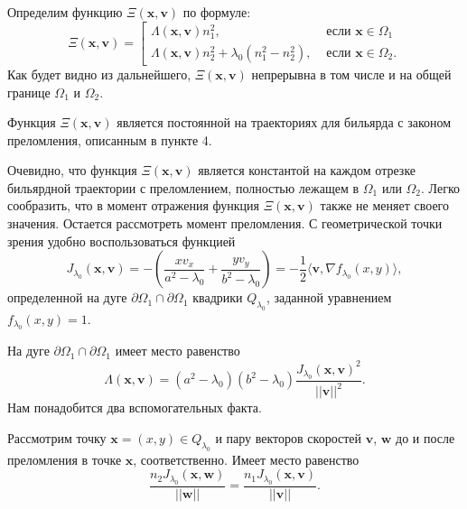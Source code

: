 Определим функцию $\Xi(\mathbf{x}, \mathbf{v})$ по формуле: 
\begin{equation*}
\Xi(\mathbf{x}, \mathbf{v}) = \left[
\begin{array}{ll}
    \Lambda(\mathbf{x}, \mathbf{v}) n_1^2, &  \text{ если } \mathbf{x} \in \Omega_1 \\
    \Lambda(\mathbf{x}, \mathbf{v}) n_2^2 + \lambda_0(n_1^2-n_2^2), & \text{ если } \mathbf{x} \in \Omega_2    .
\end{array}
\right.
\end{equation*}
Как будет видно из дальнейшего, $\Xi(\mathbf{x}, \mathbf{v})$ непрерывна в том числе и на общей границе $\Omega_1$ и $\Omega_2$.

\begin{theorem}
    Функция $\Xi(\mathbf{x}, \mathbf{v})$ является постоянной на траекториях для бильярда с законом преломления, описанным в пункте 4.
\end{theorem} 


Очевидно, что функция $\Xi(\mathbf{x}, \mathbf{v})$ является константой на каждом отрезке бильярдной траектории с преломлением, полностью лежащем в $\Omega_1$ или $\Omega_2$. Легко сообразить, что в момент отражения функция $\Xi(\mathbf{x}, \mathbf{v})$ также не меняет своего значения. Остается рассмотреть  момент преломления. С геометрической точки зрения удобно воспользоваться функцией  
$$J_{\lambda_0}(\mathbf{x}, \mathbf{v}) = -\left(\frac{x v_x}{a^2-\lambda_0} + \frac{y v_y}{b^2-\lambda_0} \right) = -\frac{1}{2}\langle\mathbf{v}, \nabla f_{\lambda_0}(x,y)\rangle,$$
определенной на дуге $\partial \Omega_1 \cap \partial \Omega_1$ квадрики $Q_{\lambda_0}$, заданной уравнением $f_{\lambda_0}(x, y) = 1$.

На дуге  $\partial \Omega_1 \cap \partial \Omega_1$ имеет место равенство
 $$\Lambda(\mathbf{x}, \mathbf{v})=(a^2-\lambda_0)(b^2-\lambda_0)\frac{J_{\lambda_0}(\mathbf{x}, \mathbf{v})^2}{||\mathbf{v}||^2}.$$
Нам понадобится два вспомогательных факта.
\begin{statement}
Рассмотрим точку $\mathbf{x}=(x, y) \in Q_{\lambda_0}$ и пару векторов скоростей $\mathbf{v}$, $\mathbf{w}$ до и после преломления в точке $\mathbf{x}$, соответственно. 
Имеет место равенство
\begin{equation}
\dfrac{n_2 J_{\lambda_0}(\mathbf{x}, \mathbf{w})}{||\mathbf{w}||} = 
\dfrac{n_1 J_{\lambda_0}(\mathbf{x}, \mathbf{v})}{||\mathbf{v}||}.
\label{eq:sect3_eq7}
\end{equation}
\label{th:joachFraction}
\end{statement}

